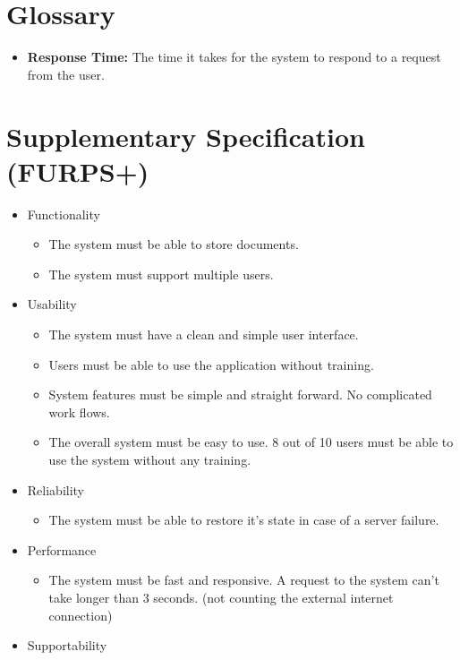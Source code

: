 \documentclass[11pt,a4paper]{article}
\begin{document}
\section{Glossary}
\begin{itemize}
\item \textbf{Response Time:} The time it takes for the system to respond to a request from the user.
\end{itemize}

\section{Supplementary Specification (FURPS+)}
\begin{itemize}
\item Functionality
	\begin{itemize}
	\item The system must be able to store documents.
	\item The system must support multiple users.
	\end{itemize}
\item Usability
	\begin{itemize}
	\item The system must have a clean and simple user interface.
	\item Users must be able to use the application without training.
	\item System features must be simple and straight forward. No complicated work flows.
	\item The overall system must be easy to use. 8 out of 10 users must be able to use the system without any training.
	\end{itemize}
\item Reliability
	\begin{itemize}
	\item The system must be able to restore it's state in case of a server failure.
	\end{itemize}
\item Performance
	\begin{itemize}
	\item The system must be fast and responsive. A request to the system can't take longer than 3 seconds. (not counting the external internet connection)
	\end{itemize}
\item Supportability
\end{itemize}
\end{document}
